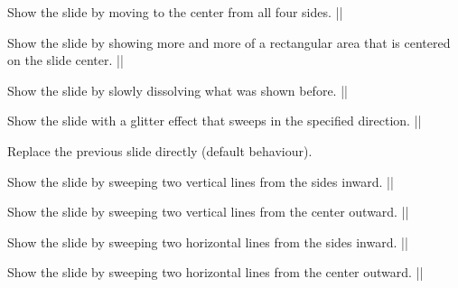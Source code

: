 \begin{command}{\transboxin{}}
  Show the slide by moving to the center from all four sides.
  \example||
\end{command}

\begin{command}{\transboxout{}}
  Show the slide by showing more and more of a rectangular area that is centered on the slide center.
  \example|\transboxout|
\end{command}

\begin{command}{\transdissolve{}}
  Show the slide by slowly dissolving what was shown before.
  \example|\transdissolve[duration=0.2]|
\end{command}

\begin{command}{\transglitter{}}
  Show the slide with a glitter effect that sweeps in the specified direction.
  \example||
\end{command}

\begin{command}{\transreplace{}}
  Replace the previous slide directly (default behaviour).
\end{command}

\begin{command}{\transsplitverticalin{}}
  Show the slide by sweeping two vertical lines from the sides inward.
  \example|\transsplitverticalin|
\end{command}

\begin{command}{\transsplitverticalout{}}
  Show the slide by sweeping two vertical lines from the center outward.
  \example|\transsplitverticalout|
\end{command}

\begin{command}{\transsplithorizontalin{}}
  Show the slide by sweeping two horizontal lines from the sides inward.
  \example|\transsplithorizontalin|
\end{command}

\begin{command}{\transsplithorizontalout{}}
  Show the slide by sweeping two horizontal lines from the center outward.
  \example|\transsplithorizontalout|
\end{command}

